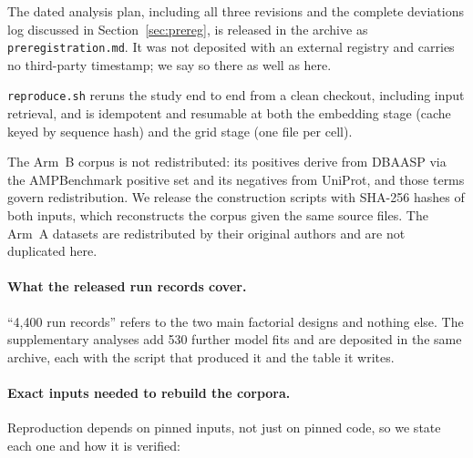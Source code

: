 \documentclass[11pt,a4paper]{article}
\begin{document}
The dated analysis plan, including all three revisions and the complete deviations log
discussed in Section~\ref{sec:prereg}, is released in the archive as
\texttt{preregistration.md}. It was not deposited with an external registry and carries no
third-party timestamp; we say so there as well as here.

\texttt{reproduce.sh} reruns the study end to end from a clean checkout, including input
retrieval, and is idempotent and resumable at both the embedding stage (cache keyed by
sequence hash) and the grid stage (one file per cell).

The Arm~B corpus is not redistributed: its positives derive from DBAASP via the
AMPBenchmark positive set and its negatives from UniProt, and those terms govern
redistribution. We release the construction scripts with SHA-256 hashes of both inputs,
which reconstructs the corpus given the same source files. The Arm~A datasets are
redistributed by their original authors and are not duplicated here.

\paragraph{What the released run records cover.} ``4{,}400 run records'' refers to the two
main factorial designs and nothing else. The supplementary analyses add 530 further model
fits and are deposited in the same archive, each with the script that produced it and the
table it writes.


\paragraph{Exact inputs needed to rebuild the corpora.} Reproduction depends on pinned
inputs, not just on pinned code, so we state each one and how it is verified:
\end{document}
